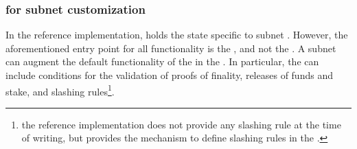 \subsubsection{\sa for subnet customization}
\label{sec:refimplsa} In the reference implementation,  holds the state specific to subnet . However, the aforementioned entry point for all functionality is the \gw, and not the \sa. A subnet can augment the default functionality of the \gw in the \sa. In particular, the \sa can include conditions for the validation of proofs of finality, releases of funds and stake, and slashing rules\footnote{the reference implementation does not provide any slashing rule at the time of writing, but provides the mechanism to define slashing rules in the \sa.}.



